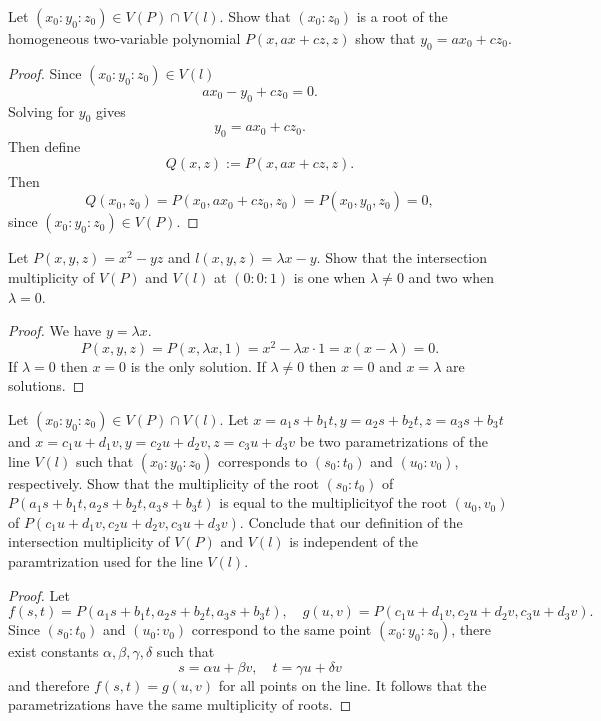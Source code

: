 \begin{tcolorbox}[title=Problem 10, breakable]
    Let $(x_0 : y_0 : z_0) \in V(P) \cap V(l)$. Show that $(x_0 : z_0)$
        is a root of the homogeneous two-variable polynomial $P(x, ax + cz, z)$
        show that $y_0 = a x_0 + c z_0$.
\end{tcolorbox}

\begin{proof}
    Since $(x_0 : y_0 : z_0) \in V(l)$
    \[
    a x_0 - y_0 + c z_0 = 0.
    \]
    Solving for $y_0$ gives
    \[
    y_0 = a x_0 + c z_0.
    \]
    Then define
    \[
    Q(x,z) := P(x, a x + c z, z).
    \]
    Then
    \[
    Q(x_0, z_0) = P(x_0, a x_0 + c z_0, z_0) = P(x_0, y_0, z_0) = 0,
    \]
    since $(x_0:y_0:z_0) \in V(P)$.
\end{proof}


\begin{tcolorbox}[title=Problem 11, breakable]
    Let $P(x, y, z) = x^2 - yz$ and $l(x, y, z) = \lambda x - y$.
    Show that the intersection multiplicity of $V(P)$ and $V(l)$ at $(0 : 0 : 1)$
    is one when $\lambda \ne 0$ and two when $\lambda = 0$.
\end{tcolorbox}

\begin{proof}
    We have $y = \lambda x$.
    \[P(x, y, z) = P(x, \lambda x, 1) = x^2 - \lambda x \cdot 1 = x(x - \lambda)= 0.\]
    If $\lambda = 0$ then $x = 0$ is the only solution.
    If $\lambda \ne 0$ then $x = 0$ and $x = \lambda$ are solutions.
\end{proof}


\begin{tcolorbox}[title=Problem 12, breakable]
    Let $(x_0 : y_0 : z_0) \in V(P) \cap V(l)$. 
    Let $x = a_1 s + b_1 t, y = a_2 s + b_2 t, z = a_3 s + b_3 t$ and 
    $x = c_1 u + d_1 v, y = c_2 u + d_2 v, z = c_3 u + d_3 v$ be two 
    parametrizations of the line $V(l)$ such that 
    $(x_0 : y_0 : z_0)$ corresponds to $(s_0 : t_0)$ and $(u_0 : v_0)$,
    respectively. 
    Show that the multiplicity of the root $(s_0 : t_0)$ of
    $P(a_1 s + b_1 t, a_2 s + b_2 t, a_3 s + b_3 t)$ is equal 
    to the multiplicityof the root $(u_0, v_0)$ of 
    $P(c_1 u + d_1 v, c_2 u + d_2 v, c_3 u + d_3 v)$. Conclude
    that our definition of the intersection multiplicity of $V(P)$
    and $V(l)$ is independent of the paramtrization used for the line $V(l)$.
\end{tcolorbox}

\begin{proof}
    Let 
    \[
    f(s,t) = P(a_1 s + b_1 t, a_2 s + b_2 t, a_3 s + b_3 t), \quad
    g(u,v) = P(c_1 u + d_1 v, c_2 u + d_2 v, c_3 u + d_3 v).
    \]
    Since $(s_0:t_0)$ and $(u_0:v_0)$ correspond to the same point $(x_0:y_0:z_0)$, there exist constants $\alpha, \beta, \gamma, \delta$ such that
    \[
    s = \alpha u + \beta v, \quad t = \gamma u + \delta v
    \]
    and therefore $f(s,t) = g(u,v)$ for all points on the line.
    It follows that the parametrizations have the same multiplicity of roots.
\end{proof}

